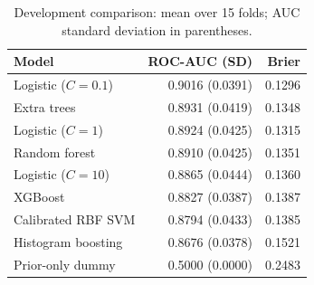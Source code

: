 \begin{table}[t]
\centering
\caption{Development comparison: mean over 15 folds; AUC standard deviation in parentheses.}
\label{tab:models}
\small
\begin{tabular}{lrr}
\toprule
Model & ROC-AUC (SD) & Brier \\
\midrule
Logistic ($C=0.1$) & 0.9016 (0.0391) & 0.1296 \\
Extra trees & 0.8931 (0.0419) & 0.1348 \\
Logistic ($C=1$) & 0.8924 (0.0425) & 0.1315 \\
Random forest & 0.8910 (0.0425) & 0.1351 \\
Logistic ($C=10$) & 0.8865 (0.0444) & 0.1360 \\
XGBoost & 0.8827 (0.0387) & 0.1387 \\
Calibrated RBF SVM & 0.8794 (0.0433) & 0.1385 \\
Histogram boosting & 0.8676 (0.0378) & 0.1521 \\
Prior-only dummy & 0.5000 (0.0000) & 0.2483 \\
\bottomrule
\end{tabular}
\end{table}
